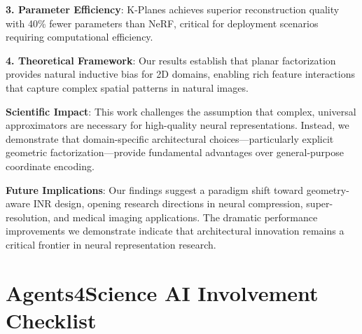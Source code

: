 \documentclass{article}
\begin{document}
\textbf{3. Parameter Efficiency}: K-Planes achieves superior reconstruction quality with 40\% fewer parameters than NeRF, critical for deployment scenarios requiring computational efficiency.

\textbf{4. Theoretical Framework}: Our results establish that planar factorization provides natural inductive bias for 2D domains, enabling rich feature interactions that capture complex spatial patterns in natural images.

\textbf{Scientific Impact}: This work challenges the assumption that complex, universal approximators are necessary for high-quality neural representations. Instead, we demonstrate that domain-specific architectural choices—particularly explicit geometric factorization—provide fundamental advantages over general-purpose coordinate encoding.

\textbf{Future Implications}: Our findings suggest a paradigm shift toward geometry-aware INR design, opening research directions in neural compression, super-resolution, and medical imaging applications. The dramatic performance improvements we demonstrate indicate that architectural innovation remains a critical frontier in neural representation research.

\small



\newpage
\section*{Agents4Science AI Involvement Checklist}
\end{document}
